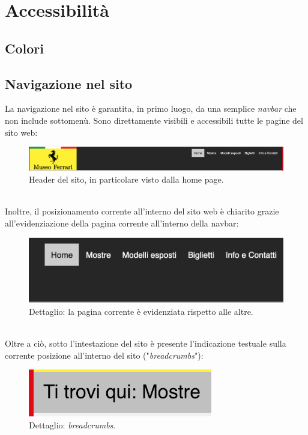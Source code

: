 \section{Accessibilità}
\subsection{Colori}


\subsection{Navigazione nel sito}
La navigazione nel sito è garantita, in primo luogo, da una semplice \textit{navbar} che non include sottomenù. Sono direttamente visibili e accessibili tutte le pagine del sito web:
\begin{figure}[h]
		\begin{center}
		\includegraphics[scale=0.3]{Images/headerSito.png}
		\caption{Header del sito, in particolare visto dalla home page.}
	\end{center}
\end{figure}\\
Inoltre, il posizionamento corrente all'interno del sito web è chiarito grazie all'evidenziazione della pagina corrente all'interno della navbar:
\begin{figure}[h]
	\begin{center}
		\includegraphics[scale=0.2]{Images/selezionePaginaCorrente.png}
		\caption{Dettaglio: la pagina corrente è evidenziata rispetto alle altre.}
	\end{center}
\end{figure}\\
Oltre a ciò, sotto l'intestazione del sito è presente l'indicazione testuale sulla corrente posizione all'interno del sito ("\textit{breadcrumbs}"):
\begin{figure}[h]
	\begin{center}
		\includegraphics[scale=0.6]{Images/breadcrumbs.png}
		\caption{Dettaglio: \textit{breadcrumbs}.}
	\end{center}
\end{figure}\\
